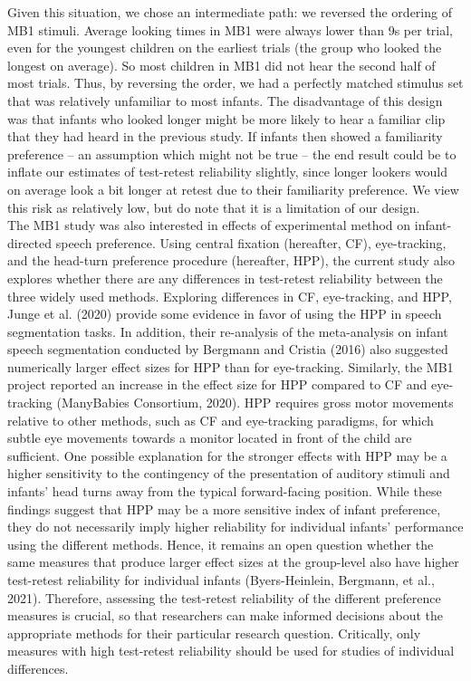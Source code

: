 \documentclass[
  man,floatsintext]{apa6}
\begin{document}
Given this situation, we chose an intermediate path: we reversed the ordering of MB1 stimuli. Average looking times in MB1 were always lower than 9s per trial, even for the youngest children on the earliest trials (the group who looked the longest on average). So most children in MB1 did not hear the second half of most trials. Thus, by reversing the order, we had a perfectly matched stimulus set that was relatively unfamiliar to most infants. The disadvantage of this design was that infants who looked longer might be more likely to hear a familiar clip that they had heard in the previous study. If infants then showed a familiarity preference -- an assumption which might not be true -- the end result could be to inflate our estimates of test-retest reliability slightly, since longer lookers would on average look a bit longer at retest due to their familiarity preference. We view this risk as relatively low, but do note that it is a limitation of our design.\\
The MB1 study was also interested in effects of experimental method on infant-directed speech preference. Using central fixation (hereafter, CF), eye-tracking, and the head-turn preference procedure (hereafter, HPP), the current study also explores whether there are any differences in test-retest reliability between the three widely used methods. Exploring differences in CF, eye-tracking, and HPP, Junge et al. (2020) provide some evidence in favor of using the HPP in speech segmentation tasks. In addition, their re-analysis of the meta-analysis on infant speech segmentation conducted by Bergmann and Cristia (2016) also suggested numerically larger effect sizes for HPP than for eye-tracking. Similarly, the MB1 project reported an increase in the effect size for HPP compared to CF and eye-tracking (ManyBabies Consortium, 2020). HPP requires gross motor movements relative to other methods, such as CF and eye-tracking paradigms, for which subtle eye movements towards a monitor located in front of the child are sufficient. One possible explanation for the stronger effects with HPP may be a higher sensitivity to the contingency of the presentation of auditory stimuli and infants' head turns away from the typical forward-facing position. While these findings suggest that HPP may be a more sensitive index of infant preference, they do not necessarily imply higher reliability for individual infants' performance using the different methods. Hence, it remains an open question whether the same measures that produce larger effect sizes at the group-level also have higher test-retest reliability for individual infants (Byers-Heinlein, Bergmann, et al., 2021). Therefore, assessing the test-retest reliability of the different preference measures is crucial, so that researchers can make informed decisions about the appropriate methods for their particular research question. Critically, only measures with high test-retest reliability should be used for studies of individual differences.
\end{document}
